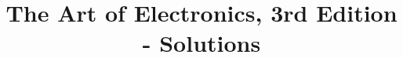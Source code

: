 \documentclass{article}
\begin{document}
\title{The Art of Electronics, 3rd Edition - Solutions}



\tableofcontents



\end{document}
